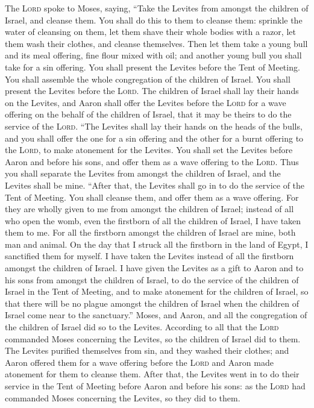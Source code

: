  The \textsc{Lord} spoke to Moses, saying, 
``Take the Levites from amongst the children of Israel, and cleanse
them.  You shall do this to them to cleanse them: sprinkle
the water of cleansing on them, let them shave their whole bodies with a
razor, let them wash their clothes, and cleanse themselves.
 Then let them take a young bull and its meal offering,
fine flour mixed with oil; and another young bull you shall take for a
sin offering.  You shall present the Levites before the
Tent of Meeting. You shall assemble the whole congregation of the
children of Israel.  You shall present the Levites before
the \textsc{Lord}. The children of Israel shall lay their hands on the
Levites,  and Aaron shall offer the Levites before the
\textsc{Lord} for a wave offering on the behalf of the children of
Israel, that it may be theirs to do the service of the \textsc{Lord}.
 ``The Levites shall lay their hands on the heads of the
bulls, and you shall offer the one for a sin offering and the other for
a burnt offering to the \textsc{Lord}, to make atonement for the
Levites.  You shall set the Levites before Aaron and
before his sons, and offer them as a wave offering to the \textsc{Lord}.
 Thus you shall separate the Levites from amongst the
children of Israel, and the Levites shall be mine. 
``After that, the Levites shall go in to do the service of the Tent of
Meeting. You shall cleanse them, and offer them as a wave offering.
 For they are wholly given to me from amongst the
children of Israel; instead of all who open the womb, even the firstborn
of all the children of Israel, I have taken them to me. 
For all the firstborn amongst the children of Israel are mine, both man
and animal. On the day that I struck all the firstborn in the land of
Egypt, I sanctified them for myself.  I have taken the
Levites instead of all the firstborn amongst the children of Israel.
 I have given the Levites as a gift to Aaron and to his
sons from amongst the children of Israel, to do the service of the
children of Israel in the Tent of Meeting, and to make atonement for the
children of Israel, so that there will be no plague amongst the children
of Israel when the children of Israel come near to the sanctuary.''
 Moses, and Aaron, and all the congregation of the
children of Israel did so to the Levites. According to all that the
\textsc{Lord} commanded Moses concerning the Levites, so the children of
Israel did to them.  The Levites purified themselves from
sin, and they washed their clothes; and Aaron offered them for a wave
offering before the \textsc{Lord} and Aaron made atonement for them to
cleanse them.  After that, the Levites went in to do
their service in the Tent of Meeting before Aaron and before his sons:
as the \textsc{Lord} had commanded Moses concerning the Levites, so they
did to them.

